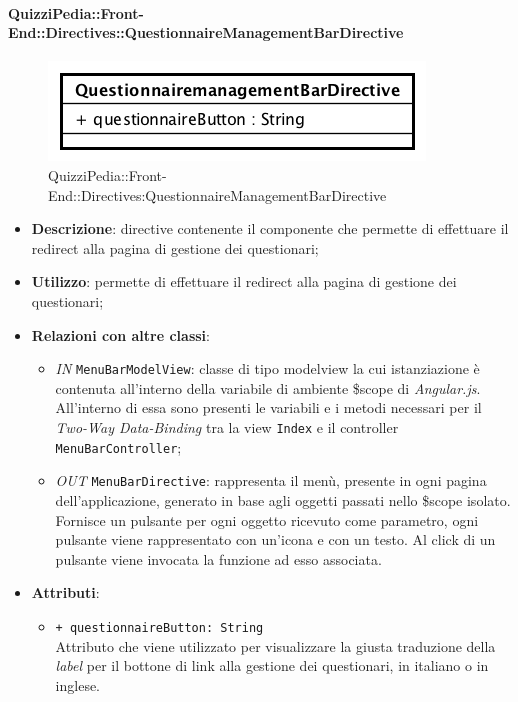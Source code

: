 \paragraph{QuizziPedia::Front-End::Directives::QuestionnaireManagementBarDirective}
\begin{figure} [ht]
	\centering
	\includegraphics[scale=0.80]{UML/Classi/Front-End/QuizziPedia_Front-end_Directives_QuestionnaireManagementBarDirective.png}
	\caption{QuizziPedia::Front-End::Directives:QuestionnaireManagementBarDirective}
\end{figure} \FloatBarrier
\begin{itemize}
	\item \textbf{Descrizione}: directive contenente il componente che permette di effettuare il redirect alla pagina di gestione dei questionari;
	\item \textbf{Utilizzo}: permette di effettuare il redirect alla pagina di gestione dei questionari;
	\item \textbf{Relazioni con altre classi}:
	\begin{itemize}
		\item \textit{IN} \texttt{MenuBarModelView}: classe di tipo modelview la cui istanziazione è contenuta all'interno della variabile di ambiente \$scope di \textit{Angular.js}. All'interno di essa sono presenti le variabili e i metodi necessari per il \textit{Two-Way Data-Binding} tra la view \texttt{Index} e il controller \texttt{MenuBarController};
		\item \textit{OUT} \texttt{MenuBarDirective}: rappresenta il menù, presente in ogni pagina dell'applicazione, generato in base agli oggetti passati nello \$scope isolato. Fornisce un pulsante per ogni oggetto ricevuto come parametro, ogni pulsante viene rappresentato con un’icona e con un testo. Al click di un pulsante viene invocata la funzione ad esso associata.  
	\end{itemize}
	\item \textbf{Attributi}:
	\begin{itemize}
		\item \texttt{+ questionnaireButton: String} \\ Attributo che viene utilizzato per visualizzare la giusta traduzione della \textit{label} per il bottone di link alla gestione dei questionari, in italiano o in inglese.
	\end{itemize}
\end{itemize}
